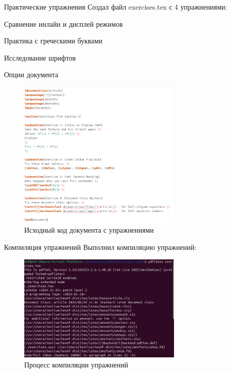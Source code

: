 \begin{frame}{Практические упражнения}
\label{ux43fux440ux430ux43aux442ux438ux447ux435ux441ux43aux438ux435-ux443ux43fux440ux430ux436ux43dux435ux43dux438ux44f}
Создал файл exercises.tex с 4 упражнениями:

Сравнение инлайн и дисплей режимов

Практика с греческими буквами

Исследование шрифтов

Опции документа

\begin{figure}
\centering
\includegraphics[width=0.7\textwidth,height=\textheight]{image_06.jpg}
\caption{Исходный код документа с упражнениями}
\end{figure}
\end{frame}

\begin{frame}[fragile]{Компиляция упражнений}
\label{ux43aux43eux43cux43fux438ux43bux44fux446ux438ux44f-ux443ux43fux440ux430ux436ux43dux435ux43dux438ux439}
Выполнил компиляцию упражнений:

\begin{Shaded}
\begin{Highlighting}[]
\end{Highlighting}
\end{Shaded}

\begin{figure}
\centering
\includegraphics[width=0.7\textwidth,height=\textheight]{image_05.jpg}
\caption{Процесс компиляции упражнений}
\end{figure}
\end{frame}

